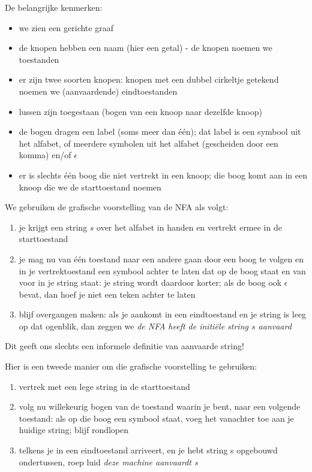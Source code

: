 De belangrijke kenmerken:

\begin{itemize}
\item we zien een gerichte graaf
\item de knopen hebben een naam (hier een getal) - de knopen noemen we toestanden
\item er zijn twee soorten knopen: knopen met een dubbel cirkeltje
getekend noemen we (aanvaardende) eindtoestanden
\item lussen zijn toegestaan (bogen van een knoop naar dezelfde knoop)
\item de bogen dragen een label (soms meer dan \'{e}\'{e}n); dat label
is een symbool uit het alfabet, of meerdere symbolen uit het alfabet
(gescheiden door een komma) en/of $\epsilon$
\item er is slechts \'{e}\'{e}n boog die niet vertrekt in een knoop;
die boog komt aan in een knoop die we de starttoestand noemen
\end{itemize}

We gebruiken de grafische voorstelling van de NFA als volgt:

\begin{enumerate}
\item je krijgt een string $s$ over het alfabet in handen en vertrekt
ermee in de starttoestand
\item je mag nu van \'{e}\'{e}n toestand naar een andere gaan door
een boog te volgen en in je vertrektoestand een symbool achter te
laten dat op de boog staat en van voor in je string staat: je string
wordt daardoor korter; als de boog ook $\epsilon$ bevat, dan hoef je
niet een teken achter te laten
\item blijf overgangen maken: als je aankomt in een eindtoestand en
je string is leeg op dat ogenblik, dan zeggen we {\em de NFA heeft de
initi\"ele string $s$ aanvaard}
\end{enumerate}

Dit geeft ons slechts een informele definitie van aanvaarde string!


Hier is een tweede manier om die grafische voorstelling te gebruiken:

\begin{enumerate}
\item vertrek met een lege string in de starttoestand
\item volg nu willekeurig bogen van de toestand waarin je bent, naar
een volgende toestand: als op die boog een symbool staat, voeg het
vanachter toe aan je huidige string; blijf rondlopen
\item telkens je in een eindtoestand arriveert, en je hebt string s
opgebouwd ondertussen, roep luid {\em deze machine aanvaardt s}
\end{enumerate}


